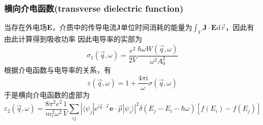 \frame
{
	\frametitle{横向介电函数\textrm{(transverse dielectric function)}}
	当存在外电场$\mathbf{E}$，介质中的传导电流$\mathbf{J}$单位时间消耗的能量为$\int_V\mathbf{J}\cdot\mathbf{E}\mathrm{d}\vec r$，因此有
由此计算得到吸收功率
{\fontsize{8.2pt}{6.2pt}}
因此电导率的实部为
\begin{displaymath}
	\sigma_1(\vec q,\omega)=\frac{e^2}{2V}\frac{\hbar\omega W(\vec q,\omega)}{\omega^2A_0^2}
\end{displaymath}
根据介电函数与电导率的关系，有
\begin{displaymath}
	\varepsilon(\vec q,\omega)=1+\frac{4\pi\mathrm{i}}{\omega}\sigma(\vec q,\omega)
\end{displaymath}
于是横向介电函数的虚部为
\begin{displaymath}
	\varepsilon_2(\vec q,\omega)=\frac{8\pi^2e^2}{m_e^2\omega^2}\frac1V\sum_{ij}|\langle\psi_j|\mathrm{e}^{\mathrm{i}\vec q\cdot\vec r}\mathbf{e}\cdot\vec p|\psi_i\rangle|^2\delta(E_j-E_i-\hbar\omega)[f(E_i)-f(E_j)]
\end{displaymath}
}

